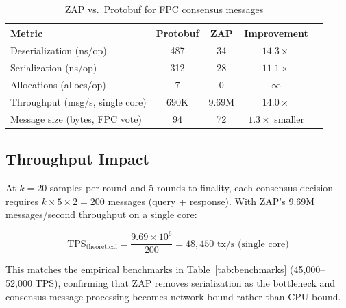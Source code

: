 \begin{table}[h]
\centering
\begin{tabular}{lcccc}
\toprule
\textbf{Metric} & \textbf{Protobuf} & \textbf{ZAP} & \textbf{Improvement} \\
\midrule
Deserialization (ns/op) & 487 & 34 & $14.3\times$ \\
Serialization (ns/op) & 312 & 28 & $11.1\times$ \\
Allocations (allocs/op) & 7 & 0 & $\infty$ \\
Throughput (msg/s, single core) & 690K & 9.69M & $14.0\times$ \\
Message size (bytes, FPC vote) & 94 & 72 & $1.3\times$ smaller \\
\bottomrule
\end{tabular}
\caption{ZAP vs.\ Protobuf for FPC consensus messages}
\label{tab:zap}
\end{table}

\subsection{Throughput Impact}

At $k = 20$ samples per round and 5 rounds to finality, each consensus decision requires $k \times 5 \times 2 = 200$ messages (query + response). With ZAP's 9.69M messages/second throughput on a single core:

\begin{equation}
\text{TPS}_{\text{theoretical}} = \frac{9.69 \times 10^6}{200} = 48{,}450 \text{ tx/s (single core)}
\end{equation}

This matches the empirical benchmarks in Table~\ref{tab:benchmarks} (45,000--52,000 TPS), confirming that ZAP removes serialization as the bottleneck and consensus message processing becomes network-bound rather than CPU-bound.

